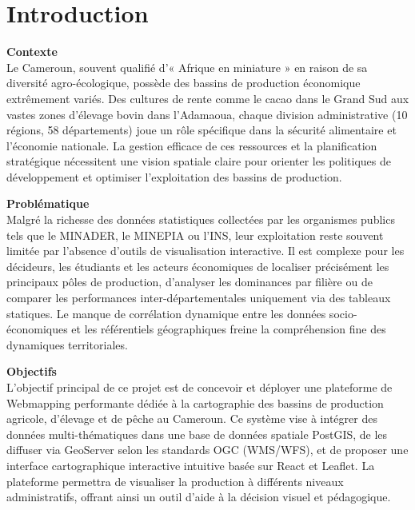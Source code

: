 \documentclass[11pt,a4paper]{article}
\begin{document}
\tableofcontents
\newpage
\section{Introduction}

\noindent \textbf{Contexte} \\
\indent Le Cameroun, souvent qualifié d'« Afrique en miniature » en raison de sa diversité agro-écologique, possède des bassins de production économique extrêmement variés. Des cultures de rente comme le cacao dans le Grand Sud aux vastes zones d’élevage bovin dans l'Adamaoua, chaque division administrative (10 régions, 58 départements) joue un rôle spécifique dans la sécurité alimentaire et l'économie nationale. La gestion efficace de ces ressources et la planification stratégique nécessitent une vision spatiale claire pour orienter les politiques de développement et optimiser l'exploitation des bassins de production.

\vspace{1.5em}
\noindent \textbf{Problématique} \\
\indent Malgré la richesse des données statistiques collectées par les organismes publics tels que le MINADER, le MINEPIA ou l'INS, leur exploitation reste souvent limitée par l'absence d'outils de visualisation interactive. Il est complexe pour les décideurs, les étudiants et les acteurs économiques de localiser précisément les principaux pôles de production, d'analyser les dominances par filière ou de comparer les performances inter-départementales uniquement via des tableaux statiques. Le manque de corrélation dynamique entre les données socio-économiques et les référentiels géographiques freine la compréhension fine des dynamiques territoriales.

\vspace{1.5em}
\noindent \textbf{Objectifs} \\
\indent L'objectif principal de ce projet est de concevoir et déployer une plateforme de Webmapping performante dédiée à la cartographie des bassins de production agricole, d'élevage et de pêche au Cameroun. Ce système vise à intégrer des données multi-thématiques dans une base de données spatiale PostGIS, de les diffuser via GeoServer selon les standards OGC (WMS/WFS), et de proposer une interface cartographique interactive intuitive basée sur React et Leaflet. La plateforme permettra de visualiser la production à différents niveaux administratifs, offrant ainsi un outil d'aide à la décision visuel et pédagogique.
\end{document}
